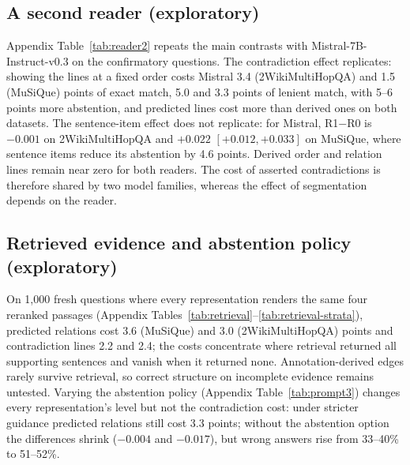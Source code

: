 

\subsection{A second reader (exploratory)}

Appendix Table~\ref{tab:reader2} repeats the main contrasts with Mistral-7B-Instruct-v0.3 on the confirmatory questions. The contradiction effect replicates: showing the lines at a fixed order costs Mistral 3.4 (2WikiMultiHopQA) and 1.5 (MuSiQue) points of exact match, 5.0 and 3.3 points of lenient match, with 5--6 points more abstention, and predicted lines cost more than derived ones on both datasets. The sentence-item effect does not replicate: for Mistral, R1$-$R0 is $-0.001$ on 2WikiMultiHopQA and $+0.022$ $[+0.012, +0.033]$ on MuSiQue, where sentence items reduce its abstention by 4.6 points. Derived order and relation lines remain near zero for both readers. The cost of asserted contradictions is therefore shared by two model families, whereas the effect of segmentation depends on the reader.



\subsection{Retrieved evidence and abstention policy (exploratory)}

On 1{,}000 fresh questions where every representation renders the same four reranked passages (Appendix Tables~\ref{tab:retrieval}--\ref{tab:retrieval-strata}), predicted relations cost 3.6 (MuSiQue) and 3.0 (2WikiMultiHopQA) points and contradiction lines 2.2 and 2.4; the costs concentrate where retrieval returned all supporting sentences and vanish when it returned none. Annotation-derived edges rarely survive retrieval, so correct structure on incomplete evidence remains untested. Varying the abstention policy (Appendix Table~\ref{tab:prompt3}) changes every representation's level but not the contradiction cost: under stricter guidance predicted relations still cost 3.3 points; without the abstention option the differences shrink ($-0.004$ and $-0.017$), but wrong answers rise from 33--40\% to 51--52\%.
